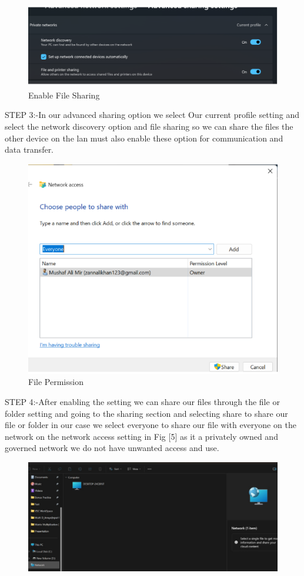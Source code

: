\documentclass[a4paper,9pt]{article}
\begin{document}
\begin{enumerate}
	\begin{figure}[H]
		\centering
		\includegraphics[width=0.8\linewidth]{6.3.png}
		\caption{Enable File Sharing}
	\end{figure}
	STEP 3:-In our advanced sharing option we select Our current profile setting and select the network discovery option and
	file sharing so we can share the files the other device on the lan must also enable these option for communication
	and data transfer.
	\begin{figure}[H]
		\centering
		\includegraphics[width=0.8\linewidth]{6.5.png}
		\caption{File Permission}
	\end{figure}
	STEP 4:-After enabling the setting we can share our files through the file or folder setting and going to the sharing
	section and selecting share to share our file or folder in our case we select everyone to share our file with everyone
	on the network on the network access setting in Fig [5] as it a privately owned and governed network we do not
	have unwanted access and use.
	\begin{figure}[H]
		\centering
		\includegraphics[width=0.8\linewidth]{6.6.png}

\end{figure}
\end{enumerate}
\end{document}
